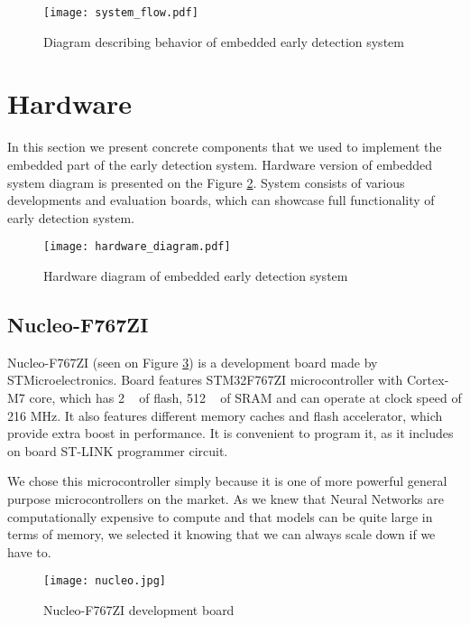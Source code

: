 \begin{figure}[ht]
        \centering
        \texttt{[image: system\_flow.pdf]} 
        \caption{ Diagram describing behavior of embedded early detection system} 
        \label{system_flow}
\end{figure}


\section{ Hardware}

In this section we present concrete components that we used to implement the embedded part of the early detection system.
Hardware version of embedded system diagram is presented on the Figure \ref{hardware_diagram}.
System consists of various developments and evaluation boards, which can showcase full functionality of early detection system.

\begin{figure}[ht]
        \centering
        \texttt{[image: hardware\_diagram.pdf]} 
        \caption{ Hardware diagram of embedded early detection system} 
        \label{hardware_diagram}
\end{figure}


\subsection{ Nucleo-F767ZI}

Nucleo-F767ZI (seen on Figure \ref{nucleo}) is a development board made by STMicroelectronics.
Board features STM32F767ZI microcontroller with Cortex-M7 core, which has 2 \si{\mega\byte} of flash, 512 \si{\kilo\byte} of SRAM and can operate at clock speed of 216 \si{\mega\hertz}.
It also features different memory caches and flash accelerator, which provide extra boost in performance.
It is convenient to program it, as it includes on board ST-LINK programmer circuit.

We chose this microcontroller simply because it is one of more powerful general purpose microcontrollers on the market.
As we knew that Neural Networks are computationally expensive to compute and that models can be quite large in terms of memory, we selected it knowing that we can always scale down if we have to.

\begin{figure}[ht]
        \centering
        \texttt{[image: nucleo.jpg]} 
        \caption{ Nucleo-F767ZI development board} 
        \label{nucleo}
\end{figure}


